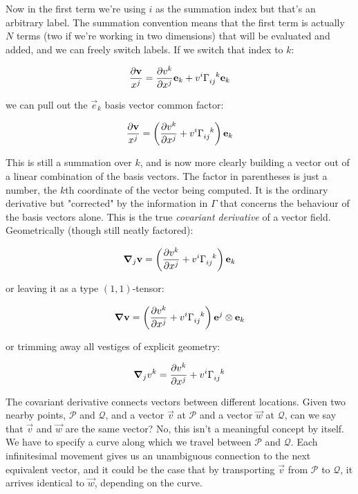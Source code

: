 Now in the first term we're using $i$ as the summation index but that's an arbitrary label. The summation convention means that the first term is actually $N$ terms (two if we're working in two dimensions) that will be evaluated and added, and we can freely switch labels. If we switch that index to $k$:

$$
\frac{\partial \vec{v}}{x^j} 
= \frac{\partial v^k}{\partial x^j} \vec{e}_k
+ v^i \Gamma\indices{_i_j^k} \vec{e}_k
$$

we can pull out the $\vec{e}_k$ basis vector common factor:

$$
\frac{\partial \vec{v}}{x^j} 
= \left(
  \frac{\partial v^k}{\partial x^j}
  + v^i \Gamma\indices{_i_j^k} 
\right)
\vec{e}_k
$$

This is still a summation over $k$, and is now more clearly building a vector out of a linear combination of the basis vectors. The factor in parentheses is just a number, the $k$th coordinate of the vector being computed. It is the ordinary derivative but "corrected" by the information in $\Gamma$ that concerns the behaviour of the basis vectors alone. This is the true \textit{covariant derivative} of a vector field. Geometrically (though still neatly factored):

$$
\grad_j \vec{v}
= \left(
  \frac{\partial v^k}{\partial x^j}
  + v^i \Gamma\indices{_i_j^k} 
\right)
\vec{e}_k
$$

or leaving it as a type $(1, 1)$-tensor:

$$
\grad \vec{v}
= \left(
  \frac{\partial v^k}{\partial x^j}
  + v^i \Gamma\indices{_i_j^k} 
\right)
\vec{e}^j \otimes \vec{e}_k
$$

or trimming away all vestiges of explicit geometry:

$$
\grad_j v^k
= 
\frac{\partial v^k}{\partial x^j}
+ v^i \Gamma\indices{_i_j^k}
$$

The covariant derivative connects vectors between different locations. Given two nearby points, $\mathcal{P}$ and $\mathcal{Q}$, and a vector $\vec{v}$ at $\mathcal{P}$ and a vector $\vec{w}$ at $\mathcal{Q}$, can we say that $\vec{v}$ and $\vec{w}$ are the same vector? No, this isn't a meaningful concept by itself. We have to specify a curve along which we travel between $\mathcal{P}$ and $\mathcal{Q}$. Each infinitesimal movement gives us an unambiguous connection to the next equivalent vector, and it could be the case that by transporting $\vec{v}$ from $\mathcal{P}$ to $\mathcal{Q}$, it arrives identical to $\vec{w}$, depending on the curve.

